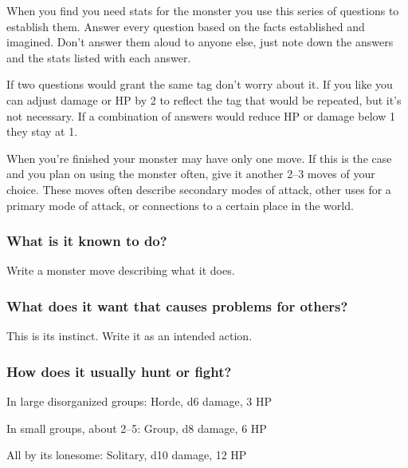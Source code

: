  

When you find you need stats for the monster you use this series of questions to establish them. Answer every question based on the facts established and imagined. Don't answer them aloud to anyone else, just note down the answers and the stats listed with each answer.

 

If two questions would grant the same tag don't worry about it. If you like you can adjust damage or HP by 2 to reflect the tag that would be repeated, but it's not necessary. If a combination of answers would reduce HP or damage below 1 they stay at 1.

 

When you're finished your monster may have only one move. If this is the case and you plan on using the monster often, give it another 2–3 moves of your choice. These moves often describe secondary modes of attack, other uses for a primary mode of attack, or connections to a certain place in the world.

 
\subsubsection{What is it known to do?}  
 

Write a monster move describing what it does.

 
\subsubsection{What does it want that causes problems for others?}   
 

This is its instinct. Write it as an intended action.

 
\subsubsection{How does it usually hunt or fight?}    
 
\startitemize[1,packed]

\item In large disorganized groups: Horde, d6 damage, 3 HP

 
\item In small groups, about 2–5: Group, d8 damage, 6 HP

 
\item All by its lonesome: Solitary, d10 damage, 12 HP


